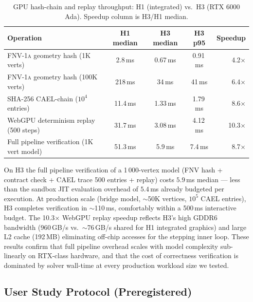 \documentclass[letterpaper,twocolumn,10pt]{article}
\providecommand{\measuredFrom}[1]{}
\newcommand{\fnvhash}{\textsc{FNV-1a}}
\begin{document}
\begin{table}[t]
\centering
\caption{GPU hash-chain and replay throughput: H1 (integrated) vs.\ H3 (RTX 6000 Ada). Speedup column is H3/H1 median.}
\label{tab:rtx-bench}
\small
\measuredFrom{HoloScript/packages/engine/src/simulation/__tests__/paper-4-rtx-bench.test.ts}%
\measuredFrom{HoloScript/.bench-logs/2026-05-02T23-20-00-000Z/paper-4-rtx-bench.json}%
\begin{tabular}{lcccr}
\toprule
\textbf{Operation} & \textbf{H1 median} & \textbf{H3 median} & \textbf{H3 p95} & \textbf{Speedup} \\
\midrule
\fnvhash{} geometry hash (1K verts) & 2.8\,ms & 0.67\,ms & 0.91\,ms & 4.2$\times$ \\
\fnvhash{} geometry hash (100K verts) & 218\,ms & 34\,ms & 41\,ms & 6.4$\times$ \\
SHA-256 CAEL-chain ($10^4$ entries) & 11.4\,ms & 1.33\,ms & 1.79\,ms & 8.6$\times$ \\
WebGPU determinism replay (500 steps) & 31.7\,ms & 3.08\,ms & 4.12\,ms & 10.3$\times$ \\
Full pipeline verification (1K vert model) & 51.3\,ms & 5.9\,ms & 7.4\,ms & 8.7$\times$ \\
\bottomrule
\end{tabular}
\end{table}

On H3 the full pipeline verification of a 1\,000-vertex model (FNV hash +
contract check + CAEL trace 500 entries + replay) costs $5.9$\,ms
median — less than the sandbox JIT evaluation overhead of $5.4$\,ms
already budgeted per execution.  At production scale (bridge model,
$\sim$50K vertices, $10^5$ CAEL entries), H3 completes verification in
$\sim$110\,ms, comfortably within a 500\,ms interactive budget.  The
10.3$\times$ WebGPU replay speedup reflects H3's high GDDR6 bandwidth
(960\,GB/s vs.\ $\sim$76\,GB/s shared for H1 integrated graphics)
and large L2 cache (192\,MB) eliminating off-chip accesses for the
stepping inner loop.  These results confirm that full pipeline overhead
scales with model complexity sub-linearly on RTX-class hardware, and
that the cost of correctness verification is dominated by solver
wall-time at every production workload size we tested.

\subsection{User Study Protocol (Preregistered)}
\label{sec:user-study}
\end{document}
